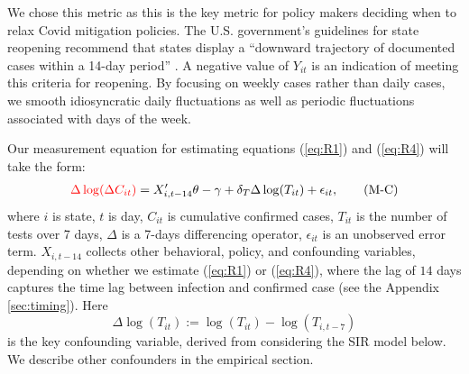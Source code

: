 \documentclass[11pt,reqno,letter]{amsart}
\theoremstyle{definition}
\def\ycolor{\color{red}}
\begin{document}
We chose this metric as this is the key metric for policy makers deciding when to relax Covid mitigation policies.  The U.S. government's guidelines for state reopening
recommend that states display a
``downward trajectory of documented cases within a 14-day period''
\citep{whitehouse2020}. A negative value of
$Y_{it}$ is an indication of meeting this
criteria for reopening. By focusing on weekly cases  rather than daily cases, we smooth idiosyncratic daily fluctuations as well as periodic fluctuations associated with days of the week.

Our measurement equation for estimating equations (\ref{eq:R1}) and (\ref{eq:R4}) will take the form:
\begin{align}
{\ycolor \Delta \log(\Delta C_{it})}  =    X_{i,t-14} '   \theta  -\gamma +  \delta_T \Delta   \log(T_{it})  + \epsilon_{it},
 \label{eq:M} \tag{M-C}
\end{align}
where $i$ is state, $t$ is day, $C_{it}$ is cumulative confirmed
cases, $T_{it}$ is the number of tests over 7 days, $\Delta$ is
a 7-days differencing operator, $\epsilon_{it}$ is an unobserved error term.
 $X_{i,t-14}$  collects other behavioral, policy, and confounding variables, depending
on whether we estimate (\ref{eq:R1}) or (\ref{eq:R4}), where the lag of $14$ days captures the time lag between infection and confirmed case (see the Appendix \ref{sec:timing}). %
   Here
$$\Delta   \log(T_{it} ):=  \log(T_{it}) - \log(T_{i,t-7})  $$ %
is the key confounding variable,
derived from considering the SIR model below. We describe other confounders in the empirical section.

\end{document}

